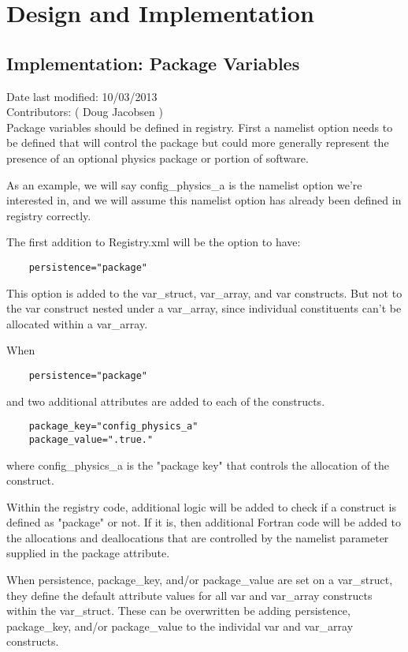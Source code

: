 \documentclass[11pt]{report}
\begin{document}

\chapter{Design and Implementation}

\section{Implementation: Package Variables}
Date last modified: 10/03/2013 \\
Contributors: ( Doug Jacobsen ) \\

Package variables should be defined in registry. First a namelist option needs
to be defined that will control the package but could more generally represent
the presence of an optional physics package or portion of software. 

As an example, we will say config\_physics\_a is the namelist option we're
interested in, and we will assume this namelist option has already been defined
in registry correctly.

The first addition to Registry.xml will be the option to have:
\begin{lstlisting}
	persistence="package"
\end{lstlisting}

This option is added to the var\_struct, var\_array, and var constructs.
But not to the var construct nested under a var\_array, since individual
constituents can't be allocated within a var\_array.

When
\begin{lstlisting}
	persistence="package"
\end{lstlisting}
and two additional attributes are added to each of the constructs.
\begin{lstlisting}
	package_key="config_physics_a"
	package_value=".true."
\end{lstlisting}
where config\_physics\_a is the "package key" that controls the allocation of the construct.

Within the registry code, additional logic will be added to check if a
construct is defined as "package" or not. If it is, then additional Fortran
code will be added to the allocations and deallocations that are controlled by
the namelist parameter supplied in the package attribute.

When persistence, package\_key, and/or package\_value are set on a var\_struct,
they define the default attribute values for all var and var\_array constructs
within the var\_struct. These can be overwritten be adding persistence, 
package\_key, and/or package\_value to the individal var and var\_array constructs.
\end{document}
